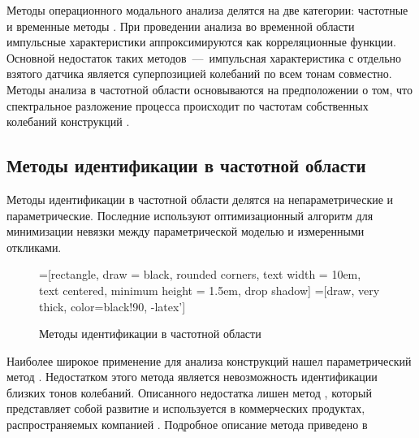 Методы операционного модального анализа делятся на две категории: частотные и временные методы \cite{lib:oma:Magalhaes}. При проведении анализа во временной области импульсные характеристики аппроксимируются как корреляционные функции. Основной недостаток таких методов~---~импульсная характеристика с отдельно взятого датчика является суперпозицией колебаний по всем тонам совместно. Методы анализа в частотной области основываются на предположении о том, что спектральное разложение процесса происходит по частотам собственных колебаний конструкций \cite{lib:oma:Brincker}. 

\subsection{Методы идентификации в частотной области}

Методы идентификации в частотной области  делятся на непараметрические и параметрические. Последние используют оптимизационный алгоритм для минимизации невязки между параметрической моделью и измеренными откликами. 

\begin{figure}[H]
	\centering
	=[rectangle, draw = black, rounded corners, text width = 10em, text centered, minimum height = 1.5em, drop shadow]
	=[draw, very thick, color=black!90, -latex']
	\caption{Методы идентификации в частотной области} \label{fig:schemeFrequencyDomainOMA}
\end{figure}

Наиболее широкое применение для анализа конструкций нашел параметрический метод  \cite{lib:oma:Guillaume}. Недостатком этого метода является невозможность идентификации близких тонов колебаний. Описанного недостатка лишен метод , который представляет собой развитие  и используется в коммерческих продуктах, распространяемых компанией . Подробное описание метода приведено в \cite{lib:oma:Peeters&Auweraer}

